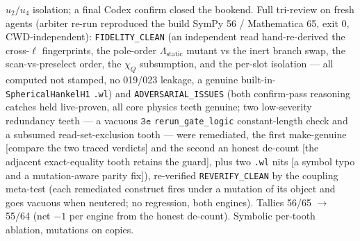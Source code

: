 \(u_2/u_4\) isolation; a final Codex confirm closed the bookend. Full tri-review on fresh agents (arbiter re-run reproduced
the build SymPy 56 / Mathematica 65, exit 0, CWD-independent): \texttt{FIDELITY\_CLEAN} (an independent read hand-re-derived the
cross-\(\ell\) fingerprints, the pole-order \(\Lambda_{\mathrm{static}}\) mutant vs the inert branch swap, the scan-vs-preselect
order, the \(\chi_Q\) subsumption, and the per-slot isolation --- all computed not stamped, no 019/023 leakage, a genuine
built-in-\texttt{SphericalHankelH1} \texttt{.wl}) and \texttt{ADVERSARIAL\_ISSUES} (both confirm-pass reasoning catches held
live-proven, all core physics teeth genuine; two low-severity redundancy teeth --- a vacuous \(\texttt{3e}\)
\texttt{rerun\_gate\_logic} constant-length check and a subsumed read-set-exclusion tooth --- were remediated, the first
make-genuine [compare the two traced verdicts] and the second an honest de-count [the adjacent exact-equality tooth retains the
guard], plus two \texttt{.wl} nits [a symbol typo and a mutation-aware parity fix]), re-verified \texttt{REVERIFY\_CLEAN} by the
coupling meta-test (each remediated construct fires under a mutation of its object and goes vacuous when neutered; no regression,
both engines). Tallies 56/65 \(\to\) 55/64 (net \(-1\) per engine from the honest de-count). Symbolic per-tooth ablation,
mutations on copies.
